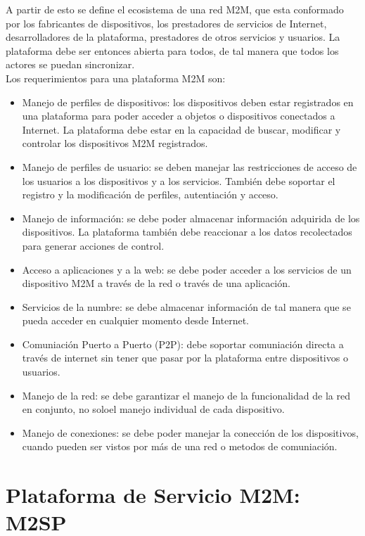 \documentclass[journal]{IEEEtran}
\begin{document}
A partir de esto se define el ecosistema de una red M2M, que esta conformado por los fabricantes de dispositivos, los prestadores de servicios de Internet, desarrolladores de la plataforma, prestadores de otros servicios y usuarios. La plataforma debe ser entonces abierta para todos, de tal manera que todos los actores se puedan sincronizar.\\

Los requerimientos para una plataforma M2M son:
\begin{itemize}
\item Manejo de perfiles de dispositivos: los dispositivos deben estar registrados en una plataforma para poder acceder a objetos o dispositivos conectados a Internet. La plataforma debe estar en la capacidad de buscar, modificar y controlar los dispositivos M2M registrados.

\item Manejo de perfiles de usuario: se deben manejar las restricciones de acceso de los usuarios a los dispositivos y a los servicios. Tambi\'en debe soportar el registro y la modificaci\'on de perfiles, autentiaci\'on y acceso.
\item Manejo de informaci\'on: se debe poder almacenar informaci\'on adquirida de los dispositivos. La plataforma tambi\'en debe reaccionar a los datos recolectados para generar acciones de control.
\item Acceso a aplicaciones y a la web: se debe poder acceder a los servicios de un dispositivo M2M  a trav\'es de la red o trav\'es de una aplicaci\'on.
\item Servicios de la numbre: se debe almacenar informaci\'on de tal manera que se pueda acceder en cualquier momento desde Internet.
\item Comuniaci\'on Puerto a Puerto (P2P): debe soportar comuniaci\'on directa a trav\'es de internet sin tener que pasar por la plataforma entre dispositivos o usuarios.
\item Manejo de la red: se debe garantizar el manejo de la funcionalidad de la red en conjunto, no soloel manejo individual de cada dispositivo.
\item Manejo de conexiones: se debe poder manejar la conecci\'on de los dispositivos, cuando pueden ser vistos por m\'as de una red o metodos de comuniaci\'on.

\end{itemize}

\section{Plataforma de Servicio M2M: M2SP}
\end{document}
